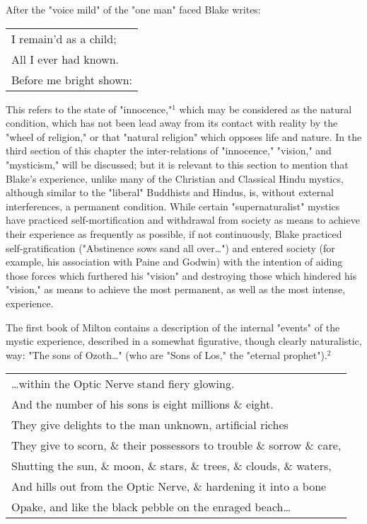 After the "voice mild" of the "one man" faced Blake writes:\par
\begin{center}
	\parbox{0.8\textwidth}{
		\centering
		\begin{tabular}{l}
			I remain'd as a child;  \\
			All I ever had known.   \\
			Before me bright shown: \\
		\end{tabular}
	}%
\end{center}
\hspace*{5mm}This refers to the state of "innocence,"$^{1}$ which may be considered
as the natural condition, which has not been lead away from its contact 
with reality by the "wheel of religion," or that "natural religion" which 
opposes life and nature. In the third section of this chapter the inter-relations
of "innocence," "vision," and "mysticism," will be discussed; but it is relevant to
this section to mention that Blake's experience, unlike many of the Christian and Classical Hindu
mystics, although similar to the "liberal" Buddhists and Hindus, is, without external
interferences, a permanent condition. While certain "supernaturalist" mystics have practiced
self-mortification and withdrawal from society as means to achieve their experience as frequently
as possible, if not continuously, Blake practiced self-gratification ("Abstinence sows sand all over\dots")
and entered society (for example, his association with Paine and Godwin) with the intention 
of aiding those forces which furthered his "vision" and destroying those which hindered his "vision,"
as means to achieve the most permanent, as well as the most intense, experience.\par
\vspace*{0.5\baselineskip}
The first book of Milton contains a description of the internal "events" of the mystic experience,
described in a somewhat figurative, though clearly naturalistic, way: "The sons of Ozoth\dots" (who are "Sons of Los,"
the "eternal prophet").$^{2}$\par
\begin{center}
	\parbox{0.8\textwidth}{
		\centering
		\begin{tabular}{l}
			\dots within the Optic Nerve stand fiery glowing.                     \\
			And the number of his sons is eight millions \& eight.                \\
			They give delights to the man unknown, artificial riches              \\
			They give to scorn, \& their possessors to trouble \& sorrow \& care, \\
			Shutting the sun, \& moon, \& stars, \& trees, \& clouds, \& waters,  \\
			And hills out from the Optic Nerve, \& hardening it into a bone       \\
			Opake, and like the black pebble on the enraged beach\dots
		\end{tabular}
	}%
\end{center}
